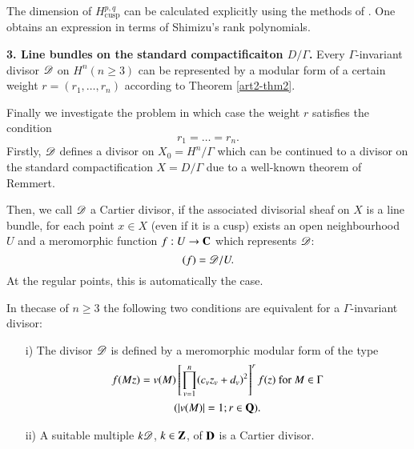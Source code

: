 \begin{remark*}
The dimension of $H^{p,q}_{\text{cusp}}$ can be calculated explicitly using the methods of \cite{art2-key1}. One obtains an expression in terms of Shimizu's rank polynomials.
\end{remark*}

\medskip
\noindent
\textbf{3. Line bundles on the standard compactificaiton $D/\Gamma$.} Every $\Gamma$-invariant divisor $\mathscr{D}$ on $H^n (n \geqslant 3)$ can be represented by a modular form of a certain weight $r = (r_1, \ldots, r_n)$ according to Theorem \ref{art2-thm2}.

Finally we investigate the problem in which case the weight $r$ satisfies the condition
$$
r_1 = \ldots = r_n.
$$
Firstly, $\mathscr{D}$ defines a divisor on $X_0=H^n/\Gamma$ which can be continued to a divisor on the standard compactification $X = D/\Gamma$ due to a well-known theorem of Remmert.

Then, we call $\mathscr{D}$ a Cartier divisor, if the associated divisorial sheaf on $X$ is a line bundle, \ie for each point $x \in X$ (even if it is a cusp) exists an open neighbourhood $U$ and a meromorphic function $f:U \to \mathbf{C}$ which represents $\mathscr{D}$:
$$
(f) = \mathscr{D}/U.
$$
At the regular points, this is automatically the case.

\begin{theorem}\label{art2-thm6}
In the\pageoriginale case of $n \geqslant 3$ the following two conditions are equivalent for a $\Gamma$-invariant divisor:
\begin{itemize}
\item[i)] The divisor $\mathscr{D}$ is defined by a meromorphic modular form of the type
\begin{multline*}
f(Mz) = v(M) \left[\prod^n_{v=1} (c_v z_v + d_v)^2 \right]^r f(z) \text{ for } M \in \Gamma \\
(|v(M)| = 1; r \in \mathbf{Q}).
\end{multline*}

\item[ii)] A suitable multiple $k \mathscr{D}$, $k \in \mathbf{Z}$, of $\mathbf{D}$ is a Cartier divisor.
\end{itemize}
\end{theorem}


